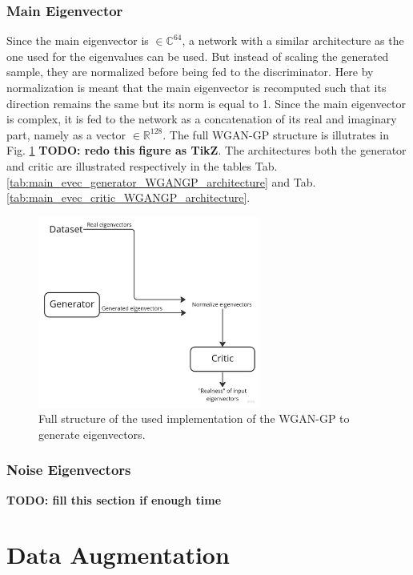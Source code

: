 \documentclass[11pt,a4paper,twoside]{report}
\begin{document}
\subsubsection{Main Eigenvector}

Since the main eigenvector is $\in \mathbb{C}^{64}$, a network with a similar architecture as the one used for the eigenvalues can be used. But instead of scaling the generated sample, they are normalized before being fed to the discriminator. Here by normalization is meant that the main eigenvector is recomputed such that its direction remains the same but its norm is equal to 1. Since the main eigenvector is complex, it is fed to the network as a concatenation of its real and imaginary part, namely as a vector $\in \mathbb{R}^{128}$. The full WGAN-GP structure is illutrates in Fig. \ref{fig:flowchart_evecs_wgangp} \textbf{TODO: redo this figure as TikZ}. The architectures both the generator and critic are illustrated respectively in the tables Tab.\ref{tab:main_evec_generator_WGANGP_architecture} and Tab.\ref{tab:main_evec_critic_WGANGP_architecture}.

\begin{figure}
    \centering
    \includegraphics[width=0.65\textwidth]{figs/flowchart_evecs_wgangp.jpg}
    \caption{Full structure of the used implementation of the WGAN-GP to generate eigenvectors.}
    \label{fig:flowchart_evecs_wgangp}
\end{figure}

\subsubsection{Noise Eigenvectors}

\textbf{TODO: fill this section if enough time}

\section{Data Augmentation}
\end{document}
